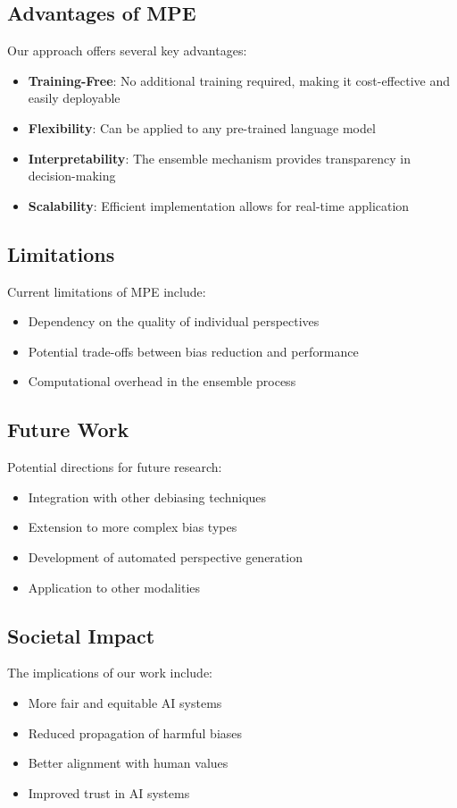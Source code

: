 \subsection{Advantages of MPE}
Our approach offers several key advantages:

\begin{itemize}
    \item \textbf{Training-Free}: No additional training required, making it cost-effective and easily deployable
    \item \textbf{Flexibility}: Can be applied to any pre-trained language model
    \item \textbf{Interpretability}: The ensemble mechanism provides transparency in decision-making
    \item \textbf{Scalability}: Efficient implementation allows for real-time application
\end{itemize}

\subsection{Limitations}
Current limitations of MPE include:

\begin{itemize}
    \item Dependency on the quality of individual perspectives
    \item Potential trade-offs between bias reduction and performance
    \item Computational overhead in the ensemble process
\end{itemize}

\subsection{Future Work}
Potential directions for future research:

\begin{itemize}
    \item Integration with other debiasing techniques
    \item Extension to more complex bias types
    \item Development of automated perspective generation
    \item Application to other modalities
\end{itemize}

\subsection{Societal Impact}
The implications of our work include:

\begin{itemize}
    \item More fair and equitable AI systems
    \item Reduced propagation of harmful biases
    \item Better alignment with human values
    \item Improved trust in AI systems
\end{itemize} 